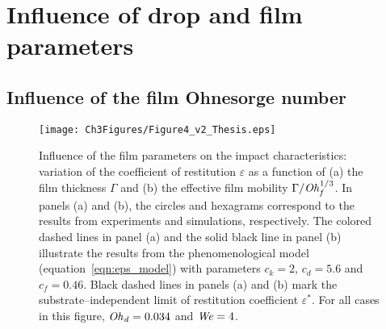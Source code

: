 \section{Influence of drop and film parameters}\label{sec:influence}

\subsection{Influence of the film Ohnesorge number}
\begin{figure}
	\centering
	\texttt{[image: Ch3Figures/Figure4\_v2\_Thesis.eps]}
	\caption{Influence of the film parameters on the impact characteristics: variation of the coefficient of restitution $\varepsilon$ as a function of (a) the film thickness $\Gamma$ and (b) the effective film mobility $\Gamma / \mathit{Oh}_\mathit{f}^{1/3}$. In panels (a) and (b), the circles and hexagrams correspond to the results from experiments and simulations, respectively. The colored dashed lines in panel (a) and the solid black line in panel (b) illustrate the results from the phenomenological model (equation~\eqref{eqn:eps_model}) with parameters $c_{k} = 2$, $c_{d} = 5.6$ and $c_{f} = 0.46$. Black dashed lines in panels (a) and (b) mark the substrate--independent limit of restitution coefficient $\varepsilon^*$. For all cases in this figure, $\mathit{Oh}_\mathit{d} = 0.034$ and $\mathit{We} = 4$.}
	\label{fig:controlParameters1}
\end{figure}

